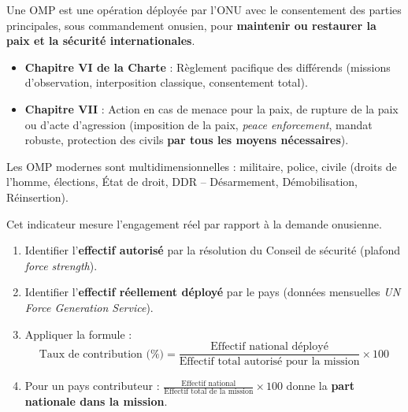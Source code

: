 \documentclass[11pt]{article}
\begin{document}
\begin{definition}
Une OMP est une opération déployée par l'ONU avec le consentement des parties principales, sous commandement onusien, pour \textbf{maintenir ou restaurer la paix et la sécurité internationales}.
\begin{itemize}
    \item \textbf{Chapitre VI de la Charte} : Règlement pacifique des différends (missions d'observation, interposition classique, consentement total).
    \item \textbf{Chapitre VII} : Action en cas de menace pour la paix, de rupture de la paix ou d'acte d'agression (imposition de la paix, \emph{peace enforcement}, mandat robuste, protection des civils \textbf{par tous les moyens nécessaires}).
\end{itemize}
Les OMP modernes sont multidimensionnelles : militaire, police, civile (droits de l'homme, élections, État de droit, DDR -- Désarmement, Démobilisation, Réinsertion).
\end{definition}

\begin{methode}
Cet indicateur mesure l'engagement réel par rapport à la demande onusienne.
\begin{enumerate}
    \item Identifier l'\textbf{effectif autorisé} par la résolution du Conseil de sécurité (plafond \emph{force strength}).
    \item Identifier l'\textbf{effectif réellement déployé} par le pays (données mensuelles \emph{UN Force Generation Service}).
    \item Appliquer la formule : 
    \[ \text{Taux de contribution (\%)} = \frac{\text{Effectif national déployé}}{\text{Effectif total autorisé pour la mission}} \times 100 \]
    \item Pour un pays contributeur : $\frac{\text{Effectif national}}{\text{Effectif total de la mission}} \times 100$ donne la \textbf{part nationale dans la mission}.
\end{enumerate}
\end{methode}
\end{document}
